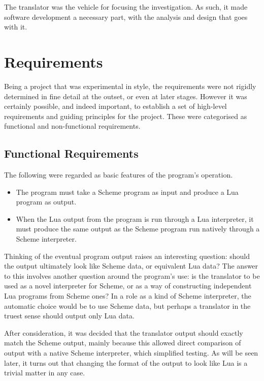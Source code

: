 The translator was the vehicle for focusing the investigation. As such, it made
software development a necessary part, with the analysis and design that goes
with it. 

\section{Requirements}

Being a project that was experimental in style, the requirements were not
rigidly determined in fine detail at the outset, or even at later stages.
However it was certainly possible, and indeed important, to establish a set of
high-level requirements and guiding principles for the project. These were
categorised as functional and non-functional requirements.

\subsection{Functional Requirements}

The following were regarded as basic features of the program's operation.
\begin{itemize}
\item The program must take a Scheme program as input and produce a Lua program
as output.
\item When the Lua output from the program is run through a Lua interpreter, it
must produce the same output as the Scheme program run natively through a Scheme
interpreter.
\end{itemize}
\begin{framed}
Thinking of the eventual program output raises an interesting question: should
the output ultimately look like Scheme data, or equivalent Lua data?  The answer
to this involves another question around the program's use: is the translator
to be used as a novel interpreter for Scheme, or as a way of constructing
independent Lua programs from Scheme ones? In a role as a kind of Scheme
interpreter, the automatic choice would be to use Scheme data, but perhaps a
translator in the truest sense should output only Lua data.

After consideration, it was decided that the translator output should exactly
match the Scheme output, mainly because this allowed direct comparison of output
with a native Scheme interpreter, which simplified testing. As will be seen
later, it turns out that changing the format of the output to look like Lua is a
trivial matter in any case.
\end{framed}

